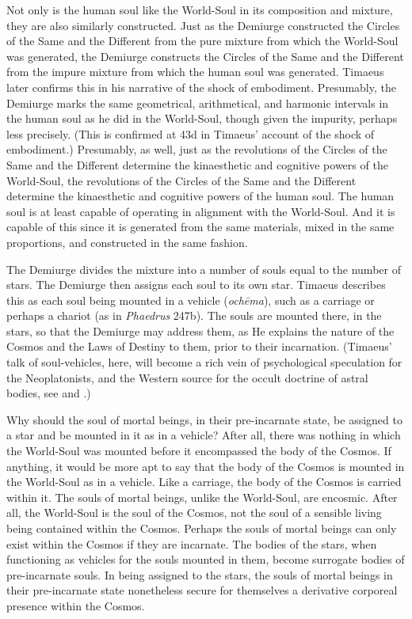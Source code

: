 Not only is the human soul like the World-Soul in its composition and mixture, they are also similarly constructed. Just as the Demiurge constructed the Circles of the Same and the Different from the pure mixture from which the World-Soul was generated, the Demiurge constructs the Circles of the Same and the Different from the impure mixture from which the human soul was generated. Timaeus later confirms this in his narrative of the shock of embodiment. Presumably, the Demiurge marks the same geometrical, arithmetical, and harmonic intervals in the human soul as he did in the World-Soul, though given the impurity, perhaps less precisely. (This is confirmed at 43d in Timaeus' account of the shock of embodiment.) Presumably, as well, just as the revolutions of the Circles of the Same and the Different determine the kinaesthetic and cognitive powers of the World-Soul, the revolutions of the Circles of the Same and the Different determine the kinaesthetic and cognitive powers of the human soul. The human soul is at least capable of operating in alignment with the World-Soul. And it is capable of this since it is generated from the same materials, mixed in the same proportions, and constructed in the same fashion.

The Demiurge divides the mixture into a number of souls equal to the number of stars. The Demiurge then assigns each soul to its own star. Timaeus describes this as each soul being mounted in a vehicle (\emph{ochēma}), such as a carriage or perhaps a chariot (as in \emph{Phaedrus} 247b). The souls are mounted there, in the stars, so that the Demiurge may address them, as He explains the nature of the Cosmos and the Laws of Destiny to them, prior to their incarnation. (Timaeus' talk of soul-vehicles, here, will become a rich vein of psychological speculation for the Neoplatonists, and the Western source for the occult doctrine of astral bodies, see \citealt[appendix 2]{Dodds:1963ul} and \citealt{Finamore:1985aa}.) 

Why should the soul of mortal beings, in their pre-incarnate state, be assigned to a star and be mounted in it as in a vehicle? After all, there was nothing in which the World-Soul was mounted before it encompassed the body of the Cosmos. If anything, it would be more apt to say that the body of the Cosmos is mounted in the World-Soul as in a vehicle. Like a carriage, the body of the Cosmos is carried within it. The souls of mortal beings, unlike the World-Soul, are encosmic. After all, the World-Soul is the soul of the Cosmos, not the soul of a sensible living being contained within the Cosmos. Perhaps the souls of mortal beings can only exist within the Cosmos if they are incarnate. The bodies of the stars, when functioning as vehicles for the souls mounted in them, become surrogate bodies of pre-incarnate souls. In being assigned to the stars, the souls of mortal beings in their pre-incarnate state nonetheless secure for themselves a derivative corporeal presence within the Cosmos. 

